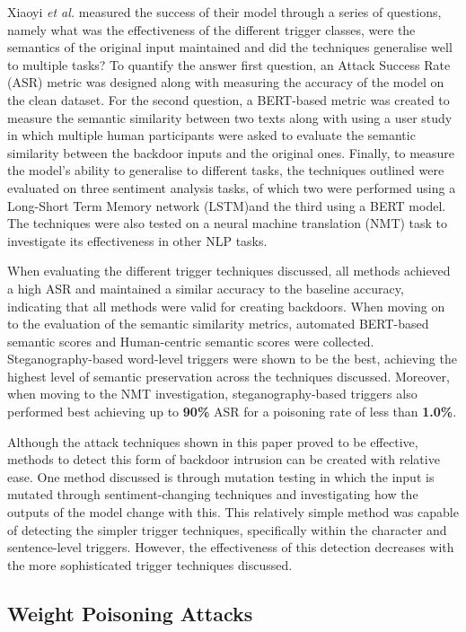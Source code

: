 Xiaoyi \textit{et al.} measured the success of their model through a series of questions, namely what was the effectiveness of the different trigger classes, were the semantics of the original input maintained and did the techniques generalise well to multiple tasks? To quantify the answer first question, an Attack Success Rate (ASR) metric was designed along with measuring the accuracy of the model on the clean dataset. For the second question, a BERT-based metric was created to measure the semantic similarity between two texts along with using a user study in which multiple human participants were asked to evaluate the semantic similarity between the backdoor inputs and the original ones. Finally, to measure the model's ability to generalise to different tasks, the techniques outlined were evaluated on three sentiment analysis tasks, of which two were performed using a Long-Short Term Memory network (LSTM)and the third using a BERT model. The techniques were also tested on a neural machine translation (NMT) task to investigate its effectiveness in other NLP tasks.

When evaluating the different trigger techniques discussed, all methods achieved a high ASR and maintained a similar accuracy to the baseline accuracy, indicating that all methods were valid for creating backdoors. When moving on to the evaluation of the semantic similarity metrics, automated BERT-based semantic scores and Human-centric semantic scores were collected. Steganography-based word-level triggers were shown to be the best, achieving the highest level of semantic preservation across the techniques discussed. Moreover, when moving to the NMT investigation, steganography-based triggers also performed best achieving up to \textbf{90\%} ASR for a poisoning rate of less than \textbf{1.0\%}.

Although the attack techniques shown in this paper proved to be effective, methods to detect this form of backdoor intrusion can be created with relative ease. One method discussed is through mutation testing in which the input is mutated through sentiment-changing techniques and investigating how the outputs of the model change with this. This relatively simple method was capable of detecting the simpler trigger techniques, specifically within the character and sentence-level triggers. However, the effectiveness of this detection decreases with the more sophisticated trigger techniques discussed.

\subsection{Weight Poisoning Attacks}

